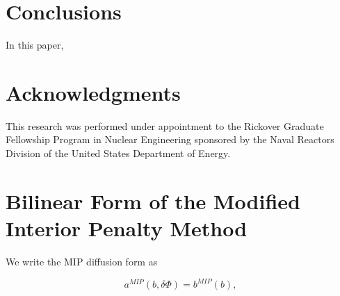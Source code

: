 \documentclass[preprint,10pt]{elsarticle}
\begin{document}

\section{Conclusions} \label{sec::conclusions}

In this paper,

\section*{Acknowledgments} 
This research was performed under appointment to the Rickover Graduate Fellowship Program in Nuclear Engineering sponsored by the Naval Reactors Division of the United States Department of Energy.




\appendix
\section{Bilinear Form of the Modified Interior Penalty Method}  \label{app::mip}

We write the MIP diffusion form as

\begin{equation}
a^{MIP}( b, \delta \Phi) = b^{MIP}(b),
\label{eq::MIP_weak_form}
\end{equation}
\end{document}
